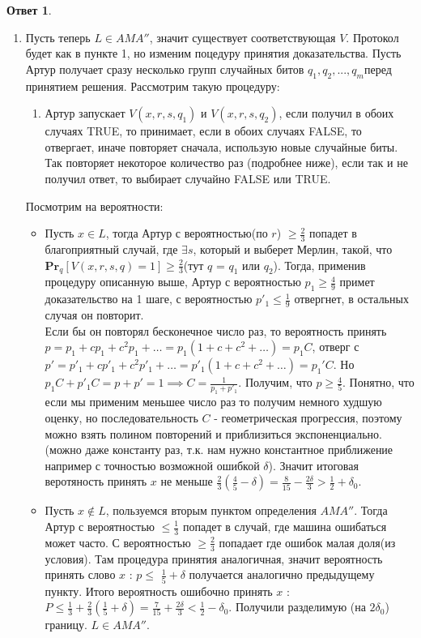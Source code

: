 \documentclass[a4paper]{article}
\theoremstyle{plain}
\theoremstyle{definition}
\newtheorem*{answer}{Ответ}
\begin{document}
\begin{answer}
\begin{enumerate}
\begin{enumerate}
    \item Пусть теперь $L \in AMA''$, значит существует соответствующая $V$. Протокол будет как в пункте 1, но изменим 
    поцедуру принятия доказательства. Пусть Артур получает сразу несколько групп случайных битов $q_1,q_2,...,q_m$перед принятием решения. Рассмотрим такую процедуру:
    \begin{enumerate}
    \item Артур запускает $V(x,r,s,q_1)$ и $V(x,r,s,q_2)$, если получил в обоих случаях TRUE, то принимает, если 
    в обоих случаях FALSE, то отвергает, иначе повторяет сначала, использую новые случайные биты. Так повторяет некоторое количество раз (подробнее ниже), если так и не получил ответ, то выбирает случайно FALSE или TRUE.
    \end{enumerate}
    Посмотрим на вероятности: 
    \begin{itemize}
    \item Пусть $x \in L$, тогда Артур с вероятностью(по $r$) $\geq \frac{2}{3}$ попадет в благоприятный случай, где $\exists s$, который и выберет Мерлин, такой, что  $\mathbf{Pr}_q [V(x,r,s,q)=1] \geq \frac{2}{3}$(тут $q$ = $q_1$ или $q_2$). Тогда, применив процедуру описанную выше, Артур с вероятностью $p_1\geq \frac{4}{9}$ примет доказательство на 1 шаге, с вероятностью $p'_1 \leq \frac{1}{9}$ отвергнет, в остальных случая он повторит. \\
    Если бы он повторял бесконечное число раз, то вероятность принять $p = p_1 + cp_1 + c^2p_1 + \ldots = p_1(1 + c + c^2 + \ldots) = p_1C$, отверг с $p' = p'_1 + cp'_1 + c^2p'_1 + \ldots = p'_1(1 + c + c^2 + \ldots) = p_1'C$. Но $p_1C + p'_1C = p + p' = 1 \implies C = \frac{1}{p_1 + p'_1}$. Получим, что $p \geq \frac{4}{5}$. Понятно, что если мы применим меньшее число раз то получим немного худшую оценку, но последовательность $C$ - геометрическая прогрессия, поэтому можно взять полином повторений и приблизиться экспоненциально. (можно даже константу раз, т.к. нам нужно константное приближение например с точностью возможной ошибкой $\delta$). Значит итоговая веротяность принять $x$ не меньше $\frac{2}{3}(\frac{4}{5} - \delta) = \frac{8}{15} - \frac{2\delta}{3} > \frac{1}{2} + \delta_0$.
    \item Пусть $x \notin L$, пользуемся вторым пунктом определения $AMA''$. Тогда Артур с вероятностью $\leq \frac{1}{3}$ попадет в случай, где машина ошибаться может часто. С вероятностью $\geq \frac{2}{3}$ попадает где ошибок малая доля(из условия). Там процедура принятия аналогичная, значит вероятность принять слово $x$ : $p \leq$ $\frac{1}{5} + \delta$ получается аналогично предыдущему пункту. Итого вероятность ошибочно принять $x$ : $P \leq \frac{1}{3} + \frac{2}{3}(\frac{1}{5} + \delta) = \frac{7}{15} + \frac{2\delta}{3} < \frac{1}{2} - \delta_0$. 
    Получили разделимую (на $2\delta_0$) границу. $L \in AMA''$. 
    \end{itemize}
    \end{enumerate}
\end{enumerate}
\end{answer}
\end{document}
